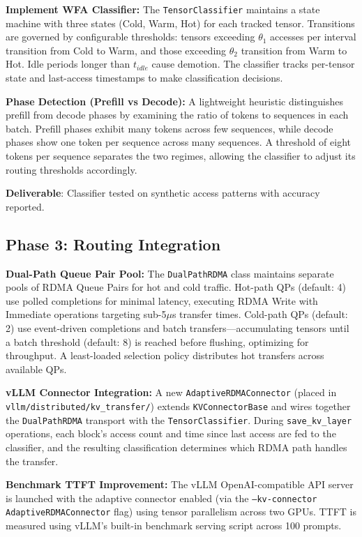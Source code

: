 \documentclass[10pt,letterpaper]{article}
\begin{document}
\textbf{Implement WFA Classifier:} The \texttt{TensorClassifier} maintains a state machine with three states (Cold, Warm, Hot) for each tracked tensor. Transitions are governed by configurable thresholds: tensors exceeding $\theta_1$ accesses per interval transition from Cold to Warm, and those exceeding $\theta_2$ transition from Warm to Hot. Idle periods longer than $t_{idle}$ cause demotion. The classifier tracks per-tensor state and last-access timestamps to make classification decisions.

\textbf{Phase Detection (Prefill vs Decode):} A lightweight heuristic distinguishes prefill from decode phases by examining the ratio of tokens to sequences in each batch. Prefill phases exhibit many tokens across few sequences, while decode phases show one token per sequence across many sequences. A threshold of eight tokens per sequence separates the two regimes, allowing the classifier to adjust its routing thresholds accordingly.

\textbf{Deliverable}: Classifier tested on synthetic access patterns with accuracy reported.

\subsection{Phase 3: Routing Integration}

\textbf{Dual-Path Queue Pair Pool:} The \texttt{DualPathRDMA} class maintains separate pools of RDMA Queue Pairs for hot and cold traffic. Hot-path QPs (default: 4) use polled completions for minimal latency, executing RDMA Write with Immediate operations targeting sub-5$\mu$s transfer times. Cold-path QPs (default: 2) use event-driven completions and batch transfers---accumulating tensors until a batch threshold (default: 8) is reached before flushing, optimizing for throughput. A least-loaded selection policy distributes hot transfers across available QPs.

\textbf{vLLM Connector Integration:} A new \texttt{AdaptiveRDMAConnector} (placed in \texttt{vllm/distributed/kv\_transfer/}) extends \texttt{KVConnectorBase} and wires together the \texttt{DualPathRDMA} transport with the \texttt{TensorClassifier}. During \texttt{save\_kv\_layer} operations, each block's access count and time since last access are fed to the classifier, and the resulting classification determines which RDMA path handles the transfer.

\textbf{Benchmark TTFT Improvement:} The vLLM OpenAI-compatible API server is launched with the adaptive connector enabled (via the \texttt{--kv-connector AdaptiveRDMAConnector} flag) using tensor parallelism across two GPUs. TTFT is measured using vLLM's built-in benchmark serving script across 100 prompts.
\end{document}

